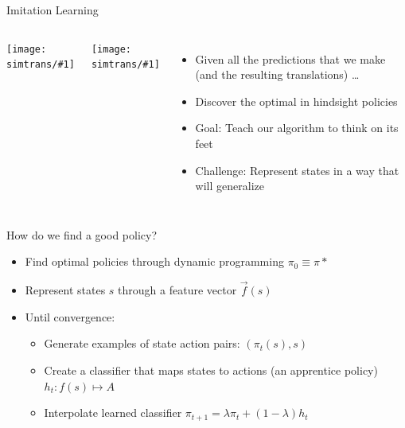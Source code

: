 \documentclass[compress]{beamer}
\newcommand{\gfxs}[2]{
\begin{center}
	\texttt{[image: simtrans/\#1]}
\end{center}
}
\begin{document}
\begin{frame}{Imitation Learning}

  \begin{columns}
       \gfxs{imitation_fold}{.8}
       \gfxs{imitation_drive}{.8}
    \begin{itemize}
      \item Given all the predictions that we make (and the resulting
        translations) \dots
      \item Discover the optimal in hindsight policies
      \item Goal: Teach our algorithm to think on its feet
      \item Challenge: Represent states in a way that will generalize
    \end{itemize}

  \end{columns}

\end{frame}

\begin{frame}{How do we find a good policy?}

  \begin{itemize}
    \item Find optimal policies through dynamic programming $\pi_0
      \equiv \pi*$
    \item Represent states $s$ through a feature vector $\vec f(s)$
      \pause
    \item Until convergence:
      \begin{itemize}
        \item Generate examples of state action pairs: $(\pi_t(s), s)$
        \item Create a classifier that maps states to actions (an
          apprentice policy) $h_t: f(s) \mapsto A$ 
    \item Interpolate learned classifier $\pi_{t+1} = \lambda \pi_t +
      (1-\lambda) h_t$
  \end{itemize}
  \end{itemize}

\end{frame}
\end{document}
